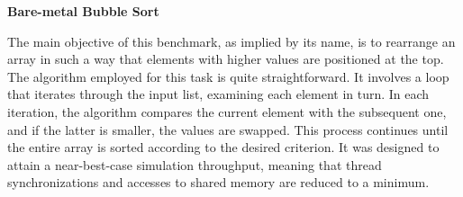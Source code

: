 \begin{table}[!htb]
    \caption{System Configurations}
    \begin{minipage}{.5\linewidth}
      \centering
        \label{tab:hostSystemConfig}
    \end{minipage}%
    \begin{minipage}{.5\linewidth}
        \centering
        \label{tab:targetSystemConfig}
    \end{minipage} 
\end{table}


\textbf{Bare-metal Bubble Sort}
\newline

The main objective of this benchmark, as implied by its name, is to rearrange an array in such a way that elements with higher values are 
positioned at the top. The algorithm employed for this task is quite straightforward. It involves a loop that iterates through the input list, 
examining each element in turn. In each iteration, the algorithm compares the current element with the subsequent one, and if the latter is 
smaller, the values are swapped. This process continues until the entire array is sorted according to the desired criterion. It was designed 
to attain a near-best-case simulation throughput, meaning that thread synchronizations and accesses to shared memory are reduced to a minimum.

